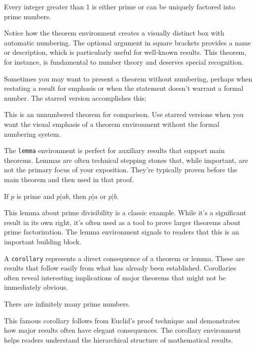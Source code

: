 \documentclass[9pt]{amsart}
\begin{document}
\begin{theorem}
	Every integer greater than 1 is either prime or can be uniquely factored into prime numbers.
\end{theorem}

Notice how the theorem environment creates a visually distinct box with
automatic numbering. The optional argument in square brackets provides a name
or description, which is particularly useful for well-known results. This
theorem, for instance, is fundamental to number theory and deserves special
recognition.

Sometimes you may want to present a theorem without numbering, perhaps when
restating a result for emphasis or when the statement doesn't warrant a formal
number. The starred version accomplishes this:

\begin{theorem*}
	This is an unnumbered theorem for comparison. Use starred versions when you want the visual emphasis of a theorem environment without the formal numbering system.
\end{theorem*}

The \texttt{lemma} environment is perfect for auxiliary results that support
main theorems. Lemmas are often technical stepping stones that, while
important, are not the primary focus of your exposition. They're typically
proven before the main theorem and then used in that proof.

\begin{lemma}
	If $p$ is prime and $p | ab$, then $p | a$ or $p | b$.
\end{lemma}

This lemma about prime divisibility is a classic example. While it's a
significant result in its own right, it's often used as a tool to prove larger
theorems about prime factorization. The lemma environment signals to readers
that this is an important building block.

A \texttt{corollary} represents a direct consequence of a theorem or lemma.
These are results that follow easily from what has already been established.
Corollaries often reveal interesting implications of major theorems that might
not be immediately obvious.

\begin{corollary}
	There are infinitely many prime numbers.
\end{corollary}

This famous corollary follows from Euclid's proof technique and demonstrates
how major results often have elegant consequences. The corollary environment
helps readers understand the hierarchical structure of mathematical results.
\end{document}
